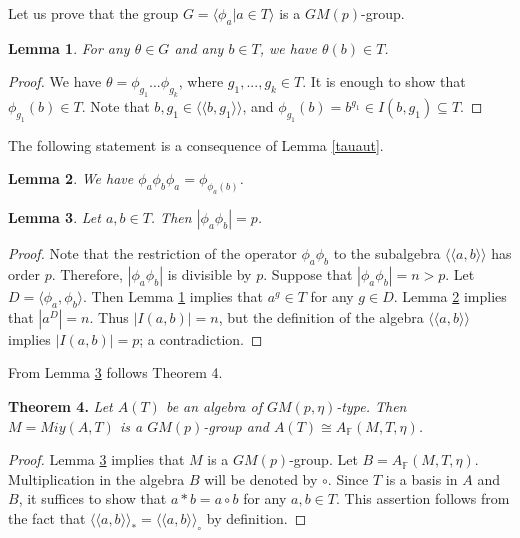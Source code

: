 \documentclass[12pt]{article}
\newcommand\F{\mathbb{F}}
\newcommand\la{\langle}
\newcommand\ra{\rangle}
\newcommand\lla{\la\!\la}
\newcommand\rra{\ra\!\ra}
\newtheorem{lem}{Lemma}
\begin{document}
Let us prove that the group $G=\la \phi_a|a\in T\ra$ is a $GM(p)$-group.


\begin{lem}\label{aut}
For any $\theta \in G$ and any $b\in T$, we have $\theta(b)\in T$.
\end{lem}
\begin{proof}
	We have $\theta=\phi_{g_1}...\phi_{g_k}$, where $g_1,...,g_k\in T$. It is enough to show that  $\phi_{g_1}(b)\in T$. Note that $b, g_1\in \lla b,g_1\rra$, and $\phi_{g_1}(b)=b^{g_1}\in I(b,g_1)\subseteq T$.
\end{proof}

The following statement is a consequence of Lemma \ref{tauaut}.
\begin{lem}\label{tauaut2}
We have $\phi_a\phi_b\phi_a=\phi_{\phi_a(b)}$.	
\end{lem}

\begin{lem}\label{MiyGM}
Let $a,b\in T$. Then $|\phi_a\phi_b|=p$.  
\end{lem}
\begin{proof}
	Note that the restriction of the operator $\phi_a\phi_b$ to the subalgebra $\lla a, b\rra$ has order $p$. Therefore, $|\phi_a\phi_b|$ is divisible by $p$.
	Suppose that $|\phi_a\phi_b|=n>p$. Let $D=\la \phi_a,\phi_b\ra$. Then Lemma \ref{aut} implies that $a^g\in T$ for any $g\in D$. Lemma \ref{tauaut2} implies that $|a^D|=n$. Thus $|I(a,b)|=n$, but the definition of the algebra $\lla a,b\rra$ implies $|I(a,b)|=p$; a contradiction.
	
\end{proof}	
From Lemma \ref{MiyGM} follows Theorem 4.
\bigskip

\noindent\textbf{Theorem 4.}
\textit{Let $A(T)$ be an algebra of $GM(p,\eta)$-type. Then $M=Miy(A,T)$ is a $GM(p)$-group and $A(T)\cong A_{\F}(M,T,\eta)$.	
}
\begin{proof}
Lemma \ref{MiyGM} implies that $M$ is a $GM(p)$-group. Let $B=A_{\F}(M,T,\eta)$. Multiplication in the algebra $B$ will be denoted by $\circ$. Since $T$ is a basis in $A$ and $B$, it suffices to show that $a*b=a\circ b$ for any $a,b\in T$. This assertion follows from the fact that $\lla a,b\rra_*=\lla a,b\rra_{\circ}$ by definition.
\end{proof}
\end{document}

